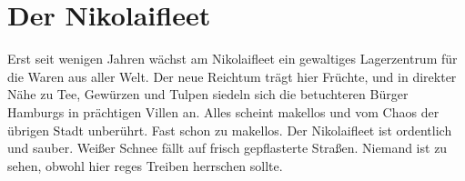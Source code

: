 
\chapter{Der Nikolaifleet}
\label{chap:nikolaifleet}

\begin{advquote}
\large Erst seit wenigen Jahren wächst am Nikolaifleet ein gewaltiges Lagerzentrum
für die Waren aus aller Welt. Der neue Reichtum trägt hier Früchte, und in direkter
Nähe zu Tee, Gewürzen und Tulpen siedeln sich die betuchteren Bürger Hamburgs in
prächtigen Villen an. Alles scheint makellos und vom Chaos der übrigen Stadt
unberührt. Fast schon zu makellos. Der Nikolaifleet ist ordentlich und sauber.
Weißer Schnee fällt auf frisch gepflasterte Straßen. Niemand ist zu sehen, obwohl
hier reges Treiben herrschen sollte.
\end{advquote}
